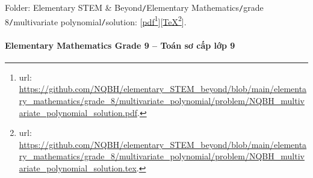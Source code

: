 \documentclass[12pt]{article}
\begin{document}
\begin{itemize}
	Folder: {\sf Elementary STEM \& Beyond{\tt/}Elementary Mathematics{\tt/}grade 8{\tt/}multivariate polynomial{\tt/}solution}: [\href{https://github.com/NQBH/elementary_STEM_beyond/blob/main/elementary_mathematics/grade_8/multivariate_polynomial/problem/NQBH_multivariate_polynomial_solution.pdf}{pdf}\footnote{{\sc url}: \url{https://github.com/NQBH/elementary_STEM_beyond/blob/main/elementary_mathematics/grade_8/multivariate_polynomial/problem/NQBH_multivariate_polynomial_solution.pdf}.}][\href{https://github.com/NQBH/elementary_STEM_beyond/blob/main/elementary_mathematics/grade_8/multivariate_polynomial/problem/NQBH_multivariate_polynomial_solution.tex}{\TeX}\footnote{{\sc url}: \url{https://github.com/NQBH/elementary_STEM_beyond/blob/main/elementary_mathematics/grade_8/multivariate_polynomial/problem/NQBH_multivariate_polynomial_solution.tex}.}].
\end{itemize}

\paragraph{Elementary Mathematics Grade 9 -- Toán sơ cấp lớp 9}
\end{document}
